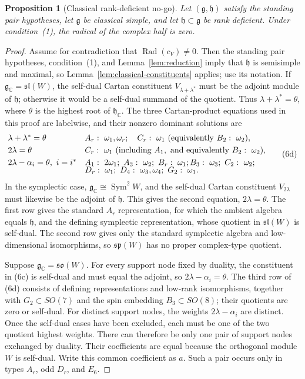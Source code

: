 \documentclass[11pt]{article}
\newtheorem{proposition}[theorem]{Proposition}
\theoremstyle{remark}
\newcommand{\g}{\mathfrak g}
\newcommand{\h}{\mathfrak h}
\newcommand{\Rad}{\operatorname{Rad}}
\begin{document}
\begin{proposition}[Classical rank-deficient no-go]
\label{prop:classical-rankdef}
Let \((\g,\h)\) satisfy the standing pair hypotheses, let \(\g\) be classical
simple, and let \(\h\subset\g\) be rank deficient. Under
condition~\textup{(1)}, the radical of the complex half is zero.
\end{proposition}
\begin{proof}
Assume for contradiction that \(\Rad(c_V)\ne0\).  Then the standing pair
hypotheses, condition~\textup{(1)}, and Lemma~\ref{lem:reduction} imply
that \(\h\) is semisimple and maximal, so
Lemma~\ref{lem:classical-constituents} applies; use its notation.  If
\(\g_{\mathbb C}=\mathfrak{sl}(W)\), the self-dual Cartan constituent
\(V_{\lambda+\lambda^*}\) must be the adjoint module of \(\h\); otherwise it
would be a self-dual summand of the quotient.  Thus
\(\lambda+\lambda^*=\theta\), where \(\theta\) is the highest root of
\(\h_{\mathbb C}\).  The three Cartan-product equations used in
this proof are labelwise, and their nonzero dominant solutions are
\[
\begin{array}{@{}ll@{}}
\lambda+\lambda^*=\theta
 & A_r:\ \omega_1,\omega_r;\quad C_r:\ \omega_1
   \ \text{(equivalently }B_2:\ \omega_2\text{)},\\[1mm]
2\lambda=\theta
 & C_r:\ \omega_1
   \ \text{(including }A_1,\text{ and equivalently }B_2:\ \omega_2\text{)},\\[1mm]
2\lambda-\alpha_i=\theta,\ i=i^*
 & A_1:\ 2\omega_1;\ A_3:\ \omega_2;\ B_r:\ \omega_1;   B_3:\ \omega_3;\ C_2:\ \omega_2;\\[-1mm]
 & D_r:\ \omega_1;\ D_4:\ \omega_3,\omega_4;\ G_2:\ \omega_1.
\end{array} \tag{6d}
\]
In the symplectic case, \(\g_{\mathbb C}\cong\operatorname{Sym}^2W\),
and the self-dual Cartan constituent \(V_{2\lambda}\) must likewise be the
adjoint of \(\h\). This gives the second equation, \(2\lambda=\theta\).
The first row gives the standard \(A_r\) representation, for which the
ambient algebra equals \(\h\), and the defining symplectic representation,
whose quotient in \(\mathfrak{sl}(W)\) is self-dual.  The second row gives
only the standard symplectic algebra and low-dimensional isomorphisms, so
\(\mathfrak{sp}(W)\) has no proper complex-type quotient.

Suppose \(\g_{\mathbb C}=\mathfrak{so}(W)\).  For every support node fixed by
duality, the constituent in \textup{(6c)} is self-dual and must equal the
adjoint, so \(2\lambda-\alpha_i=\theta\).  The third row of
\textup{(6d)} consists of defining representations and low-rank
isomorphisms, together with \(G_2\subset SO(7)\) and the spin embedding
\(B_3\subset SO(8)\); their quotients are zero or self-dual.
For distinct support nodes, the weights \(2\lambda-\alpha_i\) are
distinct. Once the self-dual cases have been excluded, each must be one of
the two quotient highest weights. There can therefore be only one pair of
support nodes exchanged by duality. Their coefficients are equal because
the orthogonal module \(W\) is self-dual. Write this common coefficient as
\(a\). Such a pair occurs only in types \(A_r\), odd \(D_r\), and \(E_6\).


\end{proof}
\end{document}
